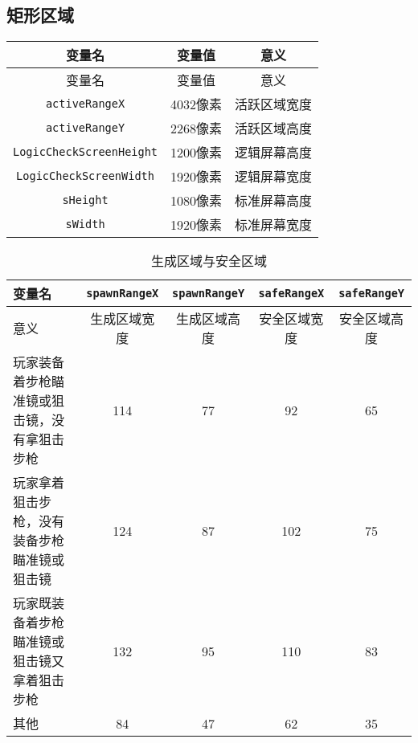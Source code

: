 \subsection{矩形区域}
\begin{longtable}{|c|c|c|}
\hline \label{tab9}变量名&变量值&意义\\\hline
\endfirsthead
变量名&变量值&意义\\\hline
\endhead
\hline
\endfoot
{\lstinline!activeRangeX!}&4032像素&活跃区域宽度\\\hline
{\lstinline!activeRangeY!}&2268像素&活跃区域高度\\\hline
{\lstinline!LogicCheckScreenHeight!}&1200像素&逻辑屏幕高度\\\hline
{\lstinline!LogicCheckScreenWidth!}&1920像素&逻辑屏幕宽度\\\hline
{\lstinline!sHeight!}&1080像素&标准屏幕高度\\\hline
{\lstinline!sWidth!}&1920像素&标准屏幕宽度\\
\end{longtable}

\begin{table}[!h]
    \centering
    \begin{tabular}{|p{}<{\centering}|c|c|c|c|}
         \hline 变量名&{\lstinline!spawnRangeX!}&{\lstinline!spawnRangeY!}&{\lstinline!safeRangeX!}&{\lstinline!safeRangeY!}  \\\hline
         意义&生成区域宽度&生成区域高度&安全区域宽度&安全区域高度\\\hline
         玩家装备着步枪瞄准镜或狙击镜，没有拿狙击步枪&114&77&92&65\\\hline
         玩家拿着狙击步枪，没有装备步枪瞄准镜或狙击镜&124&87&102&75\\\hline
         玩家既装备着步枪瞄准镜或狙击镜又拿着狙击步枪&132&95&110&83\\\hline
         其他&84&47&62&35\\\hline
    \end{tabular}
    \caption{生成区域与安全区域}
    \label{tab4618}
\end{table}

